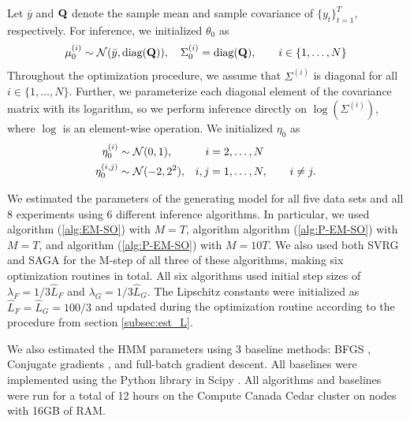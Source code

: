 Let $\bar y$ and $\mathbf{Q}$ denote the sample mean and sample covariance of $\{y_t\}_{t=1}^T$, respectively. For inference, we initialized $\theta_0$ as
%
\begin{equation*}
    \mu^{(i)}_0 \sim \mathcal{N}(\bar y, \text{diag}(\mathbf{Q})), \quad \Sigma^{(i)}_0 = \text{diag}(\mathbf{Q}), \qquad i \in \{1,\ldots,N\}
\end{equation*}
%
Throughout the optimization procedure, we assume that $\Sigma^{(i)}$ is diagonal for all $i \in \{1,\ldots,N\}$. Further, we parameterize each diagonal element of the covariance matrix with its logarithm, so we perform inference directly on $\log\left(\Sigma^{(i)}\right)$, where $\log$ is an element-wise operation.
%
We initialized $\eta_0$ as
%
\begin{align*}
    \eta^{(i)}_0 &\sim \mathcal{N}(0,1), & i & = 2,\ldots,N \\
    \eta^{(i,j)}_0 &\sim \mathcal{N}(-2,2^2), & i,j & = 1,\ldots,N, \qquad i \neq j.
\end{align*}
%

We estimated the parameters of the generating model for all five data sets and all 8 experiments using 6 different inference algorithms. In particular, we used algorithm (\ref{alg:EM-SO}) with $M=T$, algorithm algorithm (\ref{alg:P-EM-SO}) with $M=T$, and algorithm (\ref{alg:P-EM-SO}) with $M=10T$. We also used both SVRG and SAGA for the M-step of all three of these algorithms, making six optimization routines in total.
%
All six algorithms used initial step sizes of $\lambda_F = 1/3 \hat L_F$ and $\lambda_G = 1/3 \hat L_G$. The Lipschitz constants were initialized as $\hat L_F = \hat L_G = 100/3$ and updated during the optimization routine according to the procedure from section \ref{subsec:est_L}. 

We also estimated the HMM parameters using 3 baseline methods: BFGS \citep{Fletcher:2000}, Conjugate gradients \citep{Fletcher:1964}, and full-batch gradient descent.
%
All baselines were implemented using the Python library in Scipy \citep{Virtanen:2019}.
%
All algorithms and baselines were run for a total of 12 hours on the Compute Canada Cedar cluster on nodes with 16GB of RAM.

